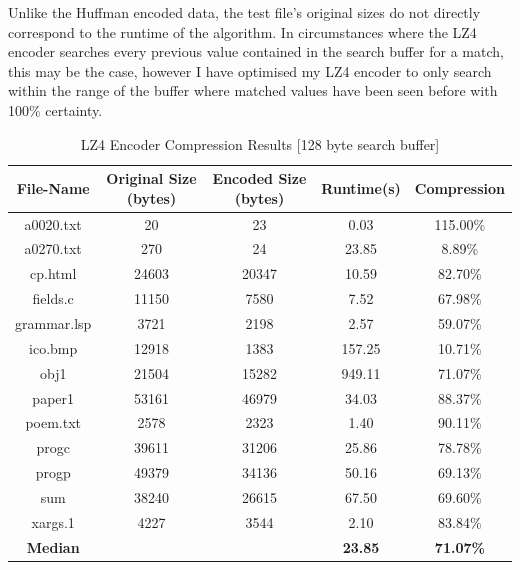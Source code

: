 \documentclass[12pt]{article}
\begin{document}
Unlike the Huffman encoded data, the test file's original sizes do not directly correspond to the runtime of the algorithm. In circumstances where the LZ4 encoder searches every previous value contained in the search buffer for a match, this may be the case, however I have optimised my LZ4 encoder to only search within the range of the buffer where matched values have been seen before with 100\% certainty.


\begin{table}[H]
	\centering
	\begin{tabular}{| c | c | c | c | c |} 
		\hline
		File-Name & Original Size (bytes) & Encoded Size (bytes) & Runtime(s) & Compression\\
		\hline
		a0020.txt & 20 & 23 & 0.03 & 115.00\%\\
		\hline
		a0270.txt & 270 & 24 & 23.85 & 8.89\%\\
		\hline
		cp.html & 24603 & 20347 & 10.59 & 82.70\%\\
		\hline
		fields.c & 11150 & 7580 & 7.52 & 67.98\%\\
		\hline
		grammar.lsp & 3721 & 2198 & 2.57 & 59.07\%\\
		\hline
		ico.bmp & 12918 & 1383 & 157.25 & 10.71\%\\
		\hline
		obj1 & 21504 & 15282 & 949.11 & 71.07\%\\
		\hline
		paper1 & 53161 & 46979 & 34.03 & 88.37\%\\
		\hline
		poem.txt & 2578 & 2323 & 1.40 & 90.11\%\\
		\hline
		progc & 39611 & 31206 & 25.86 & 78.78\%\\
		\hline
		progp & 49379 & 34136 & 50.16 & 69.13\%\\
		\hline
		sum & 38240 & 26615 & 67.50 & 69.60\%\\
		\hline
		xargs.1 & 4227 & 3544 & 2.10 & 83.84\%\\
		\Xhline{3\arrayrulewidth}
		\textbf{Median} & & & \textbf{23.85} & \textbf{71.07\%}\\
		\hline
	\end{tabular}
	\caption{LZ4 Encoder Compression Results [128 byte search buffer]}
	\label{lz4_enc_results128}
\end{table}
\end{document}
